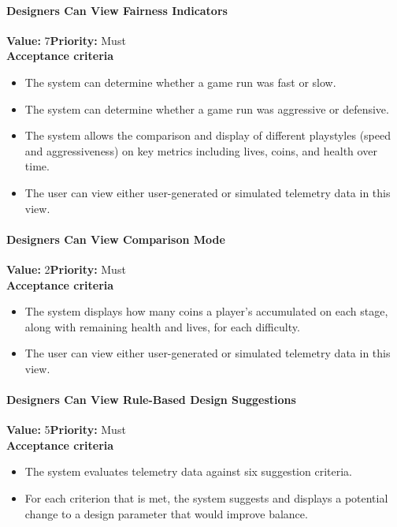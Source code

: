\paragraph{Designers Can View Fairness Indicators}
\textbf{Value:} 7\quad \textbf{Priority:} Must\\
\textbf{Acceptance criteria}
\begin{itemize}
  \item The system can determine whether a game run was fast or slow.
  \item The system can determine whether a game run was aggressive or defensive.
  \item The system allows the comparison and display of different playstyles (speed and aggressiveness) on key metrics including lives, coins, and health over time.
  \item The user can view either user-generated or simulated telemetry data in this view.
\end{itemize}

\paragraph{Designers Can View Comparison Mode}
\textbf{Value:} 2\quad \textbf{Priority:} Must\\
\textbf{Acceptance criteria}
\begin{itemize}
  \item The system displays how many coins a player's accumulated on each stage, along with remaining health and lives, for each difficulty.
  \item The user can view either user-generated or simulated telemetry data in this view.
\end{itemize}

\paragraph{Designers Can View Rule-Based Design Suggestions}
\textbf{Value:} 5\quad \textbf{Priority:} Must\\
\textbf{Acceptance criteria}
\begin{itemize}
  \item The system evaluates telemetry data against six suggestion criteria.
  \item For each criterion that is met, the system suggests and displays a potential change to a design parameter that would improve balance.
\end{itemize}

